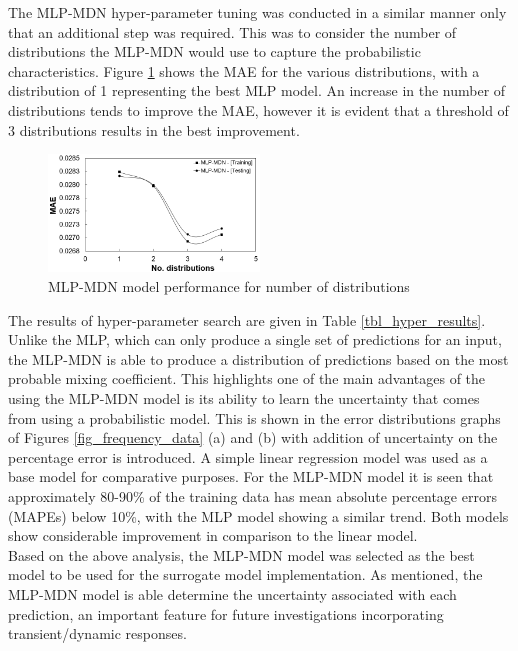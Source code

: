 \documentclass[a4paper,fleqn]{cas-sc}
\begin{document}
The MLP-MDN hyper-parameter tuning was conducted in a similar manner only that an additional step was required. This was to consider the number of distributions the MLP-MDN would use to capture the probabilistic characteristics. Figure \ref{fig_mdn_hyper} shows the MAE for the various distributions, with a distribution of 1 representing the best MLP model. An increase in the number of distributions tends to improve the MAE, however it is evident that a threshold of 3 distributions results in the best improvement.\\
\begin{figure}[h!]
	\centering
		\includegraphics[width=0.5\textwidth]{DIST_HYPER}
	  \caption{MLP-MDN model performance for number of distributions}\label{fig_mdn_hyper}
\end{figure}

The results of hyper-parameter search are given in Table \ref{tbl_hyper_results}. Unlike the MLP, which can only produce a single set of predictions for an input, the MLP-MDN is able to produce a distribution of predictions based on the most probable mixing coefficient. This highlights one of the main advantages of the using the MLP-MDN model is its ability to learn the uncertainty that comes from using a probabilistic model. This is shown in the error distributions graphs of Figures \ref{fig_frequency_data} (a) and (b) with addition of uncertainty on the percentage error is introduced. A simple linear regression model was used as a base model for comparative purposes. For the MLP-MDN model it is seen that approximately 80-90\% of the training data has mean absolute percentage errors (MAPEs) below 10\%, with the MLP model showing a similar trend. Both models show considerable improvement in comparison to the linear model.\\

Based on the above analysis, the MLP-MDN model was selected as the best model to be used for the surrogate model implementation. As mentioned, the MLP-MDN model is able determine the uncertainty associated with each prediction, an important feature for future investigations incorporating transient/dynamic responses.
\end{document}
